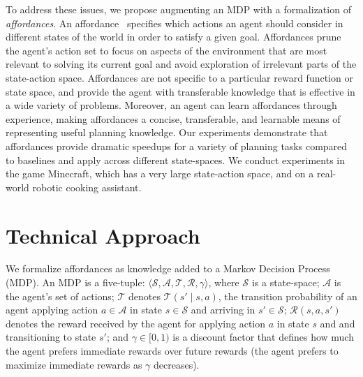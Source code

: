 \documentclass[conference]{IEEEtran}
\begin{document}
To address these issues, we propose augmenting an MDP with a
formalization of {\em affordances}. An affordance~\cite{gibson77}
specifies which actions an agent should consider in different states
of the world in order to satisfy a given goal.  Affordances prune the
agent's action set to focus on aspects of the environment that are
most relevant to solving its current goal and avoid exploration of
irrelevant parts of the state-action space. Affordances are not
specific to a particular reward function or state space, and provide
the agent with transferable knowledge that is effective in a wide
variety of problems. Moreover, an agent can learn affordances through
experience, making affordances a concise, transferable, and learnable
means of representing useful planning knowledge.  Our experiments
demonstrate that affordances provide dramatic speedups for a variety
of planning tasks compared to baselines and apply across different
state-spaces.  We conduct experiments in the game Minecraft, which has
a very large state-action space, and on a real-world robotic cooking
assistant.




\section{Technical Approach}
\label{sec:technical_approach}

We formalize affordances as knowledge added to a Markov Decision Process
(MDP).  An MDP is a five-tuple: $\langle \mathcal{S}, \mathcal{A},
\mathcal{T}, \mathcal{R}, \gamma \rangle$, where $\mathcal{S}$ is a
state-space; $\mathcal{A}$ is the agent's set of actions;
$\mathcal{T}$ denotes $\mathcal{T}(s' \mid s,a)$, the transition
probability of an agent applying action $a \in \mathcal{A}$ in state
$s \in \mathcal{S}$ and arriving in $s' \in \mathcal{S}$;
$\mathcal{R}(s,a,s')$ denotes the reward received by the agent for
applying action $a$ in state $s$ and and transitioning to state $s'$;
and $\gamma \in [0, 1)$ is a discount factor that defines how much the
  agent prefers immediate rewards over future rewards (the agent
  prefers to maximize immediate rewards as $\gamma$ decreases).

\end{document}
